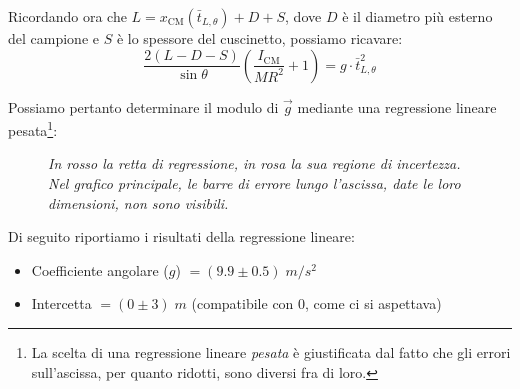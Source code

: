 \documentclass{article}
\begin{document}
Ricordando ora che $L = x_\text{CM}(\bar{t}_{L,\theta}) + D + S$, dove $D$ è il diametro
più esterno del campione e $S$ è lo spessore del cuscinetto, possiamo ricavare:
\[
    \frac{2(L-D-S)}{\sin\theta}\left(\frac{I_\text{CM}}{M R^2} + 1\right) = g \cdot \bar{t}_{L,\theta}^2
\]

Possiamo pertanto determinare il modulo di $\vec{g}$ mediante una regressione
lineare pesata\footnote{
    La scelta di una regressione lineare \emph{pesata} è giustificata dal fatto
    che gli errori sull'ascissa, per quanto ridotti, sono diversi fra di loro.
}:
\begin{figure}[H]
    \caption*{\emph{
        In rosso la retta di regressione, in rosa la sua regione di incertezza. \\
        Nel grafico principale, le barre di errore lungo l'ascissa, date le loro
        dimensioni, non sono visibili.
    }}
\end{figure}

Di seguito riportiamo i risultati della regressione lineare:
\begin{itemize}
    \item Coefficiente angolare ($g$) $=(9.9\pm0.5)\;\unit{m \per s^2}$
    \item Intercetta $=(0\pm3)\;\unit{m}$ (compatibile con $0$, come ci si aspettava)
\end{itemize}
\end{document}

